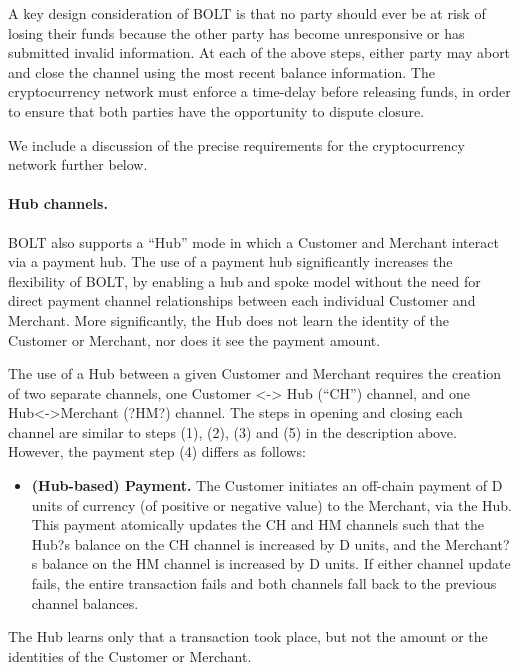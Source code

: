 \documentclass[10pt]{report}
\begin{document}
A key design consideration of BOLT is that no party should ever be at risk of losing their funds because the other party has become unresponsive or has submitted invalid information. At each of the above steps, either party may abort and close the channel using the most recent balance information. The cryptocurrency network must enforce a time-delay before releasing funds, in order to ensure that both parties have the opportunity to dispute closure. 

We include a discussion of the precise requirements for the cryptocurrency network further below.

\paragraph{Hub channels.} BOLT also supports a ``Hub'' mode in which a Customer and Merchant interact via a payment hub. The use of a payment hub significantly increases the flexibility of BOLT, by enabling a hub and spoke model without the need for direct payment channel relationships between each individual Customer and Merchant. More significantly, the Hub does not learn the identity of the Customer or Merchant, nor does it see the payment amount.

The use of a Hub between a given Customer and Merchant requires the creation of two separate channels, one Customer <-> Hub (``CH'') channel, and one Hub<->Merchant (?HM?) channel. The steps in opening and closing each channel are similar to steps (1), (2), (3) and (5) in the description above. However, the payment step (4) differs as follows:

\begin{itemize}
\item {\bf (Hub-based) Payment.} The Customer initiates an off-chain payment of D units of currency (of positive or negative value) to the Merchant, via the Hub. This payment atomically updates the CH and HM channels such that the Hub?s balance on the CH channel is increased by D units, and the Merchant?s balance on the HM channel is increased by D units. If either channel update fails, the entire transaction fails and both channels fall back to the previous channel balances.
\end{itemize}

The Hub learns only that a transaction took place, but not the amount or the identities of the Customer or Merchant.


{\normalsize

}
\rhead{}
\end{document}
